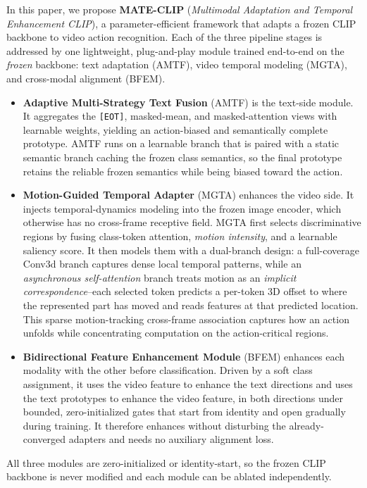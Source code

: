 In this paper, we propose \textbf{MATE-CLIP} (\emph{Multimodal Adaptation and Temporal Enhancement CLIP}), a parameter-efficient framework that adapts a frozen CLIP backbone to video action recognition.
Each of the three pipeline stages is addressed by one lightweight, plug-and-play module trained end-to-end on the \emph{frozen} backbone: text adaptation (AMTF), video temporal modeling (MGTA), and cross-modal alignment (BFEM).
\begin{itemize}
    \item \textbf{Adaptive Multi-Strategy Text Fusion} (AMTF) is the text-side module. It aggregates the \texttt{[EOT]}, masked-mean, and masked-attention views with learnable weights, yielding an action-biased and semantically complete prototype. AMTF runs on a learnable branch that is paired with a static semantic branch caching the frozen class semantics, so the final prototype retains the reliable frozen semantics while being biased toward the action.
    \item \textbf{Motion-Guided Temporal Adapter} (MGTA) enhances the video side. It injects temporal-dynamics modeling into the frozen image encoder, which otherwise has no cross-frame receptive field. MGTA first selects discriminative regions by fusing class-token attention, \emph{motion intensity}, and a learnable saliency score. It then models them with a dual-branch design: a full-coverage Conv3d branch captures dense local temporal patterns, while an \emph{asynchronous self-attention} branch treats motion as an \emph{implicit correspondence}--each selected token predicts a per-token 3D offset to where the represented part has moved and reads features at that predicted location. This sparse motion-tracking cross-frame association captures how an action unfolds while concentrating computation on the action-critical regions.
    \item \textbf{Bidirectional Feature Enhancement Module} (BFEM) enhances each modality with the other before classification. Driven by a soft class assignment, it uses the video feature to enhance the text directions and uses the text prototypes to enhance the video feature, in both directions under bounded, zero-initialized gates that start from identity and open gradually during training. It therefore enhances without disturbing the already-converged adapters and needs no auxiliary alignment loss.
\end{itemize}

All three modules are zero-initialized or identity-start, so the frozen CLIP backbone is never modified and each module can be ablated independently.

